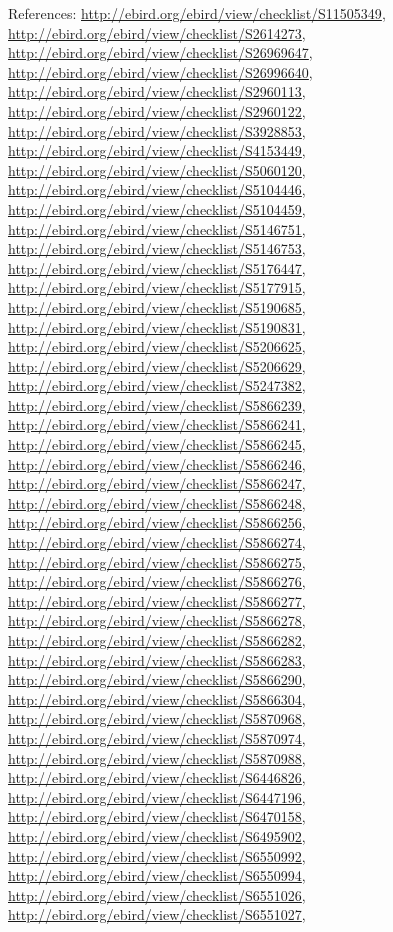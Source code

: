 \documentclass[9pt, article]{memoir}
\begin{document}
\begin{multicols}{2}
\vspace{6pt}References: 
\url{http://ebird.org/ebird/view/checklist/S11505349}, 
\url{http://ebird.org/ebird/view/checklist/S2614273}, 
\url{http://ebird.org/ebird/view/checklist/S26969647}, 
\url{http://ebird.org/ebird/view/checklist/S26996640}, 
\url{http://ebird.org/ebird/view/checklist/S2960113}, 
\url{http://ebird.org/ebird/view/checklist/S2960122}, 
\url{http://ebird.org/ebird/view/checklist/S3928853}, 
\url{http://ebird.org/ebird/view/checklist/S4153449}, 
\url{http://ebird.org/ebird/view/checklist/S5060120}, 
\url{http://ebird.org/ebird/view/checklist/S5104446}, 
\url{http://ebird.org/ebird/view/checklist/S5104459}, 
\url{http://ebird.org/ebird/view/checklist/S5146751}, 
\url{http://ebird.org/ebird/view/checklist/S5146753}, 
\url{http://ebird.org/ebird/view/checklist/S5176447}, 
\url{http://ebird.org/ebird/view/checklist/S5177915}, 
\url{http://ebird.org/ebird/view/checklist/S5190685}, 
\url{http://ebird.org/ebird/view/checklist/S5190831}, 
\url{http://ebird.org/ebird/view/checklist/S5206625}, 
\url{http://ebird.org/ebird/view/checklist/S5206629}, 
\url{http://ebird.org/ebird/view/checklist/S5247382}, 
\url{http://ebird.org/ebird/view/checklist/S5866239}, 
\url{http://ebird.org/ebird/view/checklist/S5866241}, 
\url{http://ebird.org/ebird/view/checklist/S5866245}, 
\url{http://ebird.org/ebird/view/checklist/S5866246}, 
\url{http://ebird.org/ebird/view/checklist/S5866247}, 
\url{http://ebird.org/ebird/view/checklist/S5866248}, 
\url{http://ebird.org/ebird/view/checklist/S5866256}, 
\url{http://ebird.org/ebird/view/checklist/S5866274}, 
\url{http://ebird.org/ebird/view/checklist/S5866275}, 
\url{http://ebird.org/ebird/view/checklist/S5866276}, 
\url{http://ebird.org/ebird/view/checklist/S5866277}, 
\url{http://ebird.org/ebird/view/checklist/S5866278}, 
\url{http://ebird.org/ebird/view/checklist/S5866282}, 
\url{http://ebird.org/ebird/view/checklist/S5866283}, 
\url{http://ebird.org/ebird/view/checklist/S5866290}, 
\url{http://ebird.org/ebird/view/checklist/S5866304}, 
\url{http://ebird.org/ebird/view/checklist/S5870968}, 
\url{http://ebird.org/ebird/view/checklist/S5870974}, 
\url{http://ebird.org/ebird/view/checklist/S5870988}, 
\url{http://ebird.org/ebird/view/checklist/S6446826}, 
\url{http://ebird.org/ebird/view/checklist/S6447196}, 
\url{http://ebird.org/ebird/view/checklist/S6470158}, 
\url{http://ebird.org/ebird/view/checklist/S6495902}, 
\url{http://ebird.org/ebird/view/checklist/S6550992}, 
\url{http://ebird.org/ebird/view/checklist/S6550994}, 
\url{http://ebird.org/ebird/view/checklist/S6551026}, 
\url{http://ebird.org/ebird/view/checklist/S6551027}, 

\end{multicols}
\end{document}
